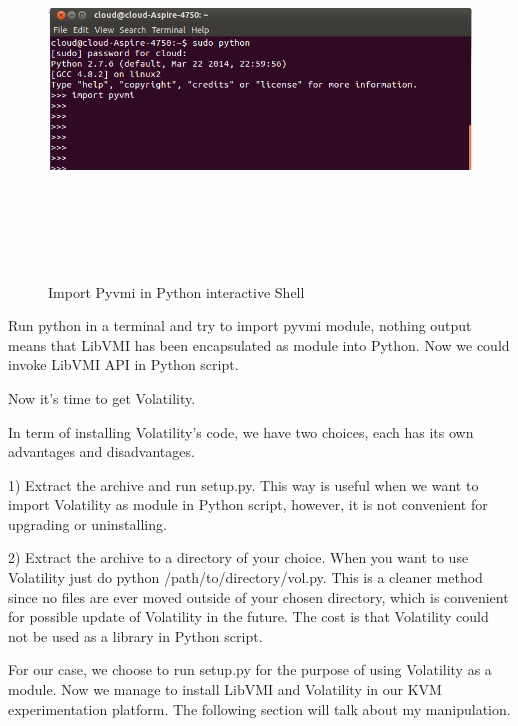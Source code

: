 \begin{figure}[htbp]
	\centering
		\includegraphics[width=14cm, height= 10cm ]{Figures/Figure22.png}
	\caption[Import Pyvmi in Python interactive Shell]{Import Pyvmi in Python interactive Shell}
	\label{fig:Import Pyvmi in Python interactive Shell}
\end{figure}

Run python in a terminal and try to import pyvmi module, nothing output means that LibVMI has been encapsulated as module into Python. 
Now we could invoke LibVMI API in Python script.

Now it’s time to get Volatility.

In term of installing Volatility's code, we have two choices, each has its own advantages and disadvantages.

1) Extract the archive and run setup.py. This way is useful when we want to import Volatility as module in Python script, however, it is not convenient for upgrading or uninstalling.


2) Extract the archive to a directory of your choice. When you want to use Volatility just do python /path/to/directory/vol.py. This is a cleaner method since no files are ever moved outside of your chosen directory, which is convenient for possible update of Volatility in the future. The cost is that Volatility could not be used as a library in Python script.


For our case, we choose to run setup.py for the purpose of using Volatility as a module. Now we manage to install LibVMI and Volatility in our KVM experimentation platform. The following section will talk about my manipulation.

